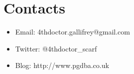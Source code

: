 \chapter{Contacts}
\label{cha:CONTACTS}

\begin{itemize}
    \item Email: 4thdoctor.gallifrey@gmail.com
    \item Twitter: @4thdoctor\_scarf
    \item Blog: http://www.pgdba.co.uk
\end{itemize}

